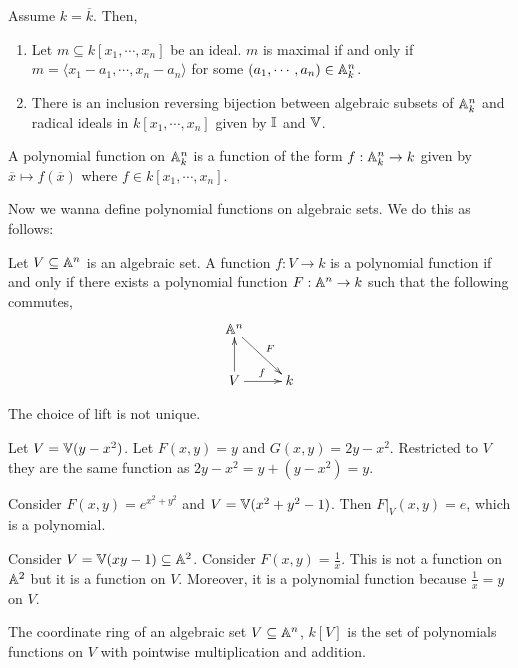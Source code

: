 \documentclass[12pt]{amsart}
\begin{document}
\begin{theorem}
    Assume $k = \overline{k}$. Then, 
    \begin{enumerate}
        \item Let $m \subseteq k[x_1, \cdots, x_n]$ be an ideal. $m$ is maximal if and only if $m = \langle x_1-a_1, \cdots, x_n-a_n\rangle$ for some $(a_1, \cdots, a_n) \in \mathbb A^n_k$. 
        \item There is an inclusion reversing bijection between algebraic subsets of $\mathbb A^n_k$ and radical ideals in $k[x_1, \cdots, x_n]$ given by $\mathbb I$ and $\mathbb V$. 
    \end{enumerate}
\end{theorem}

\begin{definition}
    A polynomial function on $\mathbb A^n_k$ is a function of the form $f: \mathbb A^n_k \to k$ given by $\overline{x} \mapsto f(\overline{x})$ where $f \in k[x_1, \cdots, x_n]$. 
\end{definition}

Now we wanna define polynomial functions on algebraic sets. We do this as follows:
\begin{definition}
    Let $V \subseteq \mathbb A^n$ is an algebraic set. A function $f: V \to k$ is a polynomial function if and only if there exists a polynomial function $F: \mathbb A^n \to k$ such that the following commutes, 
        \[ \xymatrix{ \A^n \ar[rd]^F \\ V \ar[u] \ar[r]^f & k }\]
\end{definition}

The choice of lift is not unique. 
\begin{example}
    Let $V = \mathbb V(y-x^2)$. Let $F(x,y) = y$ and $G(x,y) = 2y-x^2$. Restricted to $V$ they are the same function as $2y-x^2 = y+(y-x^2) = y$. 
\end{example}

\begin{example}
    Consider $F(x,y) = e^{x^2+y^2}$ and $V = \mathbb V(x^2+y^2-1)$. Then $F|_V(x,y) = e$, which is a polynomial. 
\end{example}

\begin{example}
    Consider $V = \mathbb V(xy-1) \subseteq \mathbb A^2$. Consider $F(x,y) = \frac{1}{x}$. This is not a function on $\mathbb A^2$ but it is a function on $V$. Moreover, it is a polynomial function because $\frac{1}{x} = y$ on $V$. 
\end{example}

\begin{definition}
    The coordinate ring of an algebraic set $V \subseteq \mathbb A^n$, $k[V]$ is the set of polynomials functions on $V$ with pointwise multiplication and addition. 
\end{definition}
\end{document}
